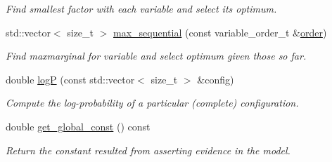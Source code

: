 \begin{DoxyCompactItemize}
\begin{DoxyCompactList}\small\item\em Find smallest factor with each variable and select its optimum. \end{DoxyCompactList}\item 
\hypertarget{classmerlin_1_1graphical__model_a29f7fb295dea0c444de5fe03f1da1e91}{}std\+::vector$<$ size\+\_\+t $>$ \hyperlink{classmerlin_1_1graphical__model_a29f7fb295dea0c444de5fe03f1da1e91}{max\+\_\+sequential} (const variable\+\_\+order\+\_\+t \&\hyperlink{classmerlin_1_1graphical__model_a90bcf3fb02f0f43bf57520e834875c78}{order})\label{classmerlin_1_1graphical__model_a29f7fb295dea0c444de5fe03f1da1e91}

\begin{DoxyCompactList}\small\item\em Find {\itshape maxmarginal} for variable and select optimum given those so far. \end{DoxyCompactList}\item 
\hypertarget{classmerlin_1_1graphical__model_aaf48222f85e0d6cbf1b289219953863f}{}double \hyperlink{classmerlin_1_1graphical__model_aaf48222f85e0d6cbf1b289219953863f}{log\+P} (const std\+::vector$<$ size\+\_\+t $>$ \&config)\label{classmerlin_1_1graphical__model_aaf48222f85e0d6cbf1b289219953863f}

\begin{DoxyCompactList}\small\item\em Compute the log-\/probability of a particular (complete) configuration. \end{DoxyCompactList}\item 
\hypertarget{classmerlin_1_1graphical__model_afad10d82af1bf8a138e00a58f98ec18c}{}double \hyperlink{classmerlin_1_1graphical__model_afad10d82af1bf8a138e00a58f98ec18c}{get\+\_\+global\+\_\+const} () const \label{classmerlin_1_1graphical__model_afad10d82af1bf8a138e00a58f98ec18c}

\begin{DoxyCompactList}\small\item\em Return the constant resulted from asserting evidence in the model. \end{DoxyCompactList}\end{DoxyCompactItemize}
